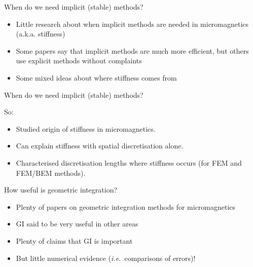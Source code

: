 \documentclass[18pt]{beamer}
\newlength{\wideitemsep}
\let\olditem\item
\renewcommand{\item}{\setlength{\itemsep}{\wideitemsep}\olditem}
\begin{document}
\begin{frame}{When do we need implicit (stable) methods?}

  \begin{itemize}
  \item Little research about when implicit methods are needed in micromagnetics (a.k.a. stiffness)
  \item Some papers say that implicit methods are much more efficient, but others use explicit methods without complaints
  \item Some mixed ideas about where stiffness comes from
  \end{itemize}

\end{frame}

\begin{frame}{When do we need implicit (stable) methods?}

  So:
  \begin{itemize}
  \item Studied origin of stiffness in micromagnetics.
  \item Can explain stiffness with spatial discretisation alone.
  \item Characterised discretisation lengths where stiffness occurs (for
    FEM and FEM/BEM methods).
  \end{itemize}

\end{frame}



\begin{frame}{How useful is geometric integration?}

  \begin{itemize}
  \item Plenty of papers on geometric integration methods for micromagnetics
  \item GI said to be very useful in other areas
  \item Plenty of claims that GI is important
  \item But little numerical evidence (\textit{i.e.}\ comparisons of errors)!
  \end{itemize}

\end{frame}
\end{document}
